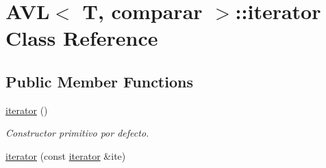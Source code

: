 \hypertarget{classAVL_1_1iterator}{\section{A\-V\-L$<$ T, comparar $>$\-:\-:iterator Class Reference}
\label{classAVL_1_1iterator}
}
\subsection*{Public Member Functions}
\begin{DoxyCompactItemize}
\item 
\hypertarget{classAVL_1_1iterator_aac7d1d8a40c1e1f97a4f61227e383672}{\hyperlink{classAVL_1_1iterator_aac7d1d8a40c1e1f97a4f61227e383672}{iterator} ()}\label{classAVL_1_1iterator_aac7d1d8a40c1e1f97a4f61227e383672}

\begin{DoxyCompactList}\small\item\em Constructor primitivo por defecto. \end{DoxyCompactList}\item 
\hypertarget{classAVL_1_1iterator_adee84db4341bcbff00677d796a50d21a}{\hyperlink{classAVL_1_1iterator_adee84db4341bcbff00677d796a50d21a}{iterator} (const \hyperlink{classAVL_1_1iterator}{iterator} \&ite)}\label{classAVL_1_1iterator_adee84db4341bcbff00677d796a50d21a}


\end{DoxyCompactItemize}
